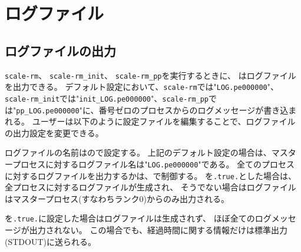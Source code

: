 \section{ログファイル} \label{sec:log}


\subsection{ログファイルの出力}

\verb|scale-rm|、 \verb|scale-rm_init|、 \verb|scale-rm_pp|を実行するときに、
\scalerm はログファイルを出力できる。
デフォルト設定において、\verb|scale-rm|では"\verb|LOG.pe000000|"、
\verb|scale-rm_init|では"\verb|init_LOG.pe000000|"、\verb|scale-rm_pp|では"\verb|pp_LOG.pe000000|"に、番号ゼロのプロセスからのログメッセージが書き込まれる。
ユーザーは以下のように設定ファイルを編集することで、ログファイルの出力設定を変更できる。


ログファイルの名前はので設定する。
上記のデフォルト設定の場合は、マスタープロセスに対するログファイル名は"\verb|LOG.pe000000|"である。
全てのプロセスに対するログファイルを出力するかは、で制御する。
を\verb|.true.|とした場合は、全プロセスに対するログファイルが生成され、
そうでない場合はログファイルはマスタープロセス(すなわちランク0)からのみ出力される。

を\verb|.true.|に設定した場合はログファイルは生成されず、
ほぼ全てのログメッセージが出力されない。
この場合でも、経過時間に関する情報だけは標準出力(STDOUT)に送られる。

